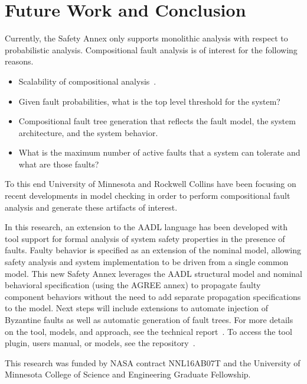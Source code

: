 \section{Future Work and Conclusion}

Currently, the Safety Annex only supports monolithic analysis with respect to probabilistic analysis. Compositional fault analysis is of interest for the following reasons. 
\begin{itemize}
\item Scalability of compositional analysis~\cite{NFM2012:CoGaMiWhLaLu, hilt2013:MuWhRaHe}.
\item Given fault probabilities, what is the top level threshold for the system?
\item Compositional fault tree generation that reflects the fault model, the system architecture, and the system behavior.
\item What is the maximum number of active faults that a system can tolerate and what are those faults?
\end{itemize}

To this end University of Minnesota and Rockwell Collins have been focusing on recent developments in model checking in order to perform compositional fault analysis and generate these artifacts of interest. 

In this research, an extension to the AADL language has been developed with tool support for formal analysis of system safety properties in the presence of faults. Faulty behavior is specified as an extension of the nominal model, allowing safety analysis and system implementation to be driven from a single common model. This new Safety Annex leverages the AADL structural model and nominal behavioral specification (using the AGREE annex) to propagate faulty component behaviors without the need to add separate propagation specifications to the model.   Next steps will include extensions to automate injection of Byzantine faults as well as automatic generation of fault trees.  For more details on the tool, models, and approach, see the technical report~\cite{SATechReport}. To access the tool plugin, users manual, or models, see the repository~\cite{SAGithub}. 

\vspace{2 mm}
 This research was funded by NASA contract NNL16AB07T and the University of Minnesota College of Science and Engineering Graduate Fellowship.


